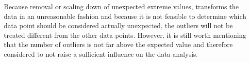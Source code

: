 Because removal or scaling down of unexpected extreme values, transforms the data in an unreasonable fashion and because it is not feasible to determine which data point should be considered actually unexpected, the outliers will not be treated different from the other data points. However, it is still worth mentioning that the number of outliers is not far above the expected value and therefore considered to not raise a sufficient influence on the data analysis.


